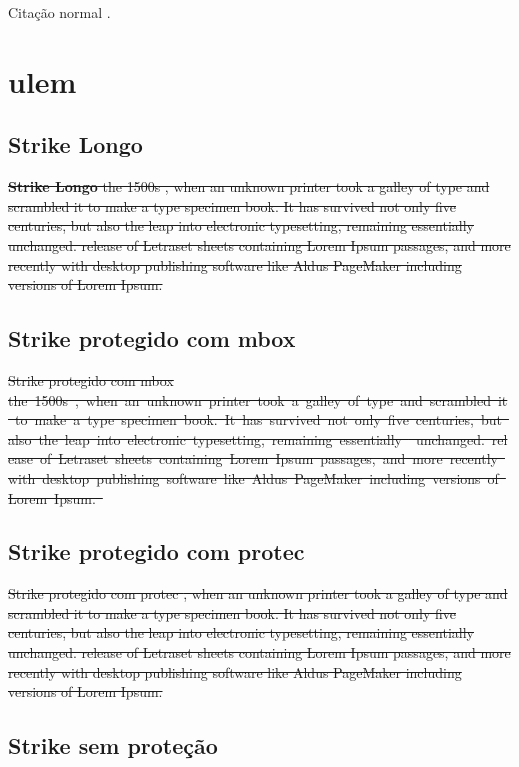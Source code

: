 \documentclass{article}
\begin{document}
  

Citação normal \cite{b1}.

\section{ulem}

\subsection{Strike Longo}

\sout{\textbf{Strike Longo} the 1500s , when an unknown printer took a galley of type and scrambled it to make a type specimen book. It has survived not only five    centuries, but also the leap into electronic     typesetting, remaining essentially unchanged. release of Letraset sheets containing Lorem Ipsum passages, and more recently with desktop publishing software like Aldus PageMaker including versions of Lorem Ipsum.
}

\subsection{Strike protegido com mbox}

\sout{Strike protegido com mbox \mbox{the 1500s \citep{b1}, when an unknown printer took a galley of type and scrambled it to make a type specimen book. It has survived not only five    centuries, but also the leap into electronic     typesetting, remaining essentially \citet{b1} unchanged. release of Letraset sheets containing Lorem Ipsum passages, and more recently with desktop publishing software like Aldus PageMaker including versions of Lorem Ipsum.
        \cite{b1}}}

\subsection{Strike protegido com protec}
\sout{Strike protegido com protec \protect\citep{b1}, when an unknown printer took a galley of type and scrambled it to make a type specimen book. It has survived not only five    centuries, but also the leap into electronic     typesetting, remaining essentially \protect\citet{b1} unchanged. release of Letraset sheets containing Lorem Ipsum passages, and more recently with desktop publishing software like Aldus PageMaker including versions of Lorem Ipsum. \protect\cite{b1}}

\subsection{Strike sem proteção}
\end{document}
